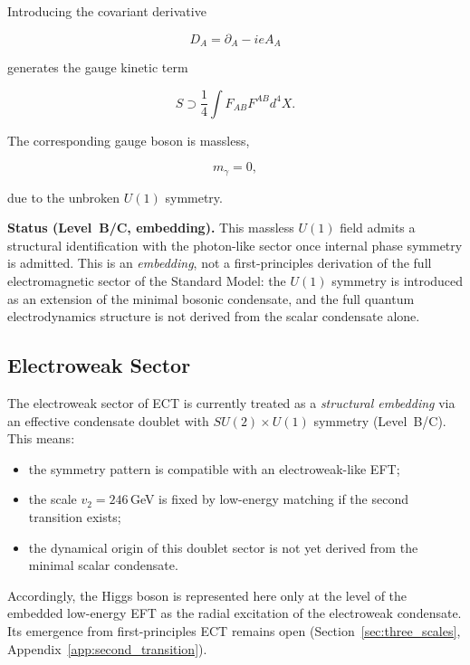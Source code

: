 \documentclass[11pt,a4paper]{article}
\numberwithin{equation}{section}
\begin{document}
Introducing the covariant derivative

\begin{equation}
D_A = \partial_A - i e A_A
\end{equation}

generates the gauge kinetic term

\begin{equation}
S \supset \frac{1}{4} \int F_{AB}F^{AB} d^4X .
\end{equation}

The corresponding gauge boson is massless,

\begin{equation}
m_\gamma = 0,
\end{equation}

due to the unbroken $U(1)$ symmetry.

\textbf{Status (Level~B/C, embedding).}
This massless $U(1)$ field admits a structural identification
with the photon-like sector once internal phase symmetry is admitted.
This is an \emph{embedding}, not a first-principles derivation of
the full electromagnetic sector of the Standard Model:
the $U(1)$ symmetry is introduced as an extension of the minimal
bosonic condensate, and the full quantum electrodynamics structure
is not derived from the scalar condensate alone.

\subsection{Electroweak Sector}

The electroweak sector of ECT is currently treated as a
\emph{structural embedding} via an effective condensate doublet with
$SU(2)\times U(1)$ symmetry (Level~B/C).
This means:
\begin{itemize}
  \item the symmetry pattern is compatible with an electroweak-like EFT;
  \item the scale $v_2=246$\,GeV is fixed by low-energy matching if the
    second transition exists;
  \item the dynamical origin of this doublet sector is not yet derived
    from the minimal scalar condensate.
\end{itemize}
Accordingly, the Higgs boson is represented here only at the level of
the embedded low-energy EFT as the radial excitation of the
electroweak condensate.
Its emergence from first-principles ECT remains open
(Section~\ref{sec:three_scales}, Appendix~\ref{app:second_transition}).
\end{document}
